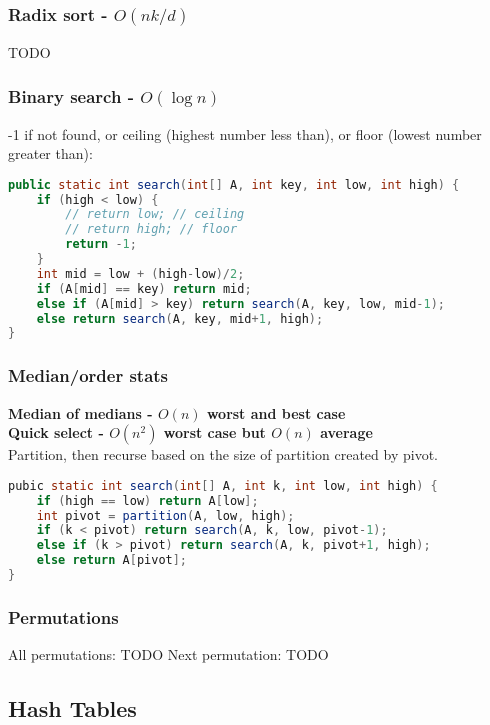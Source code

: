 \documentclass{article}
\begin{document}
\subsubsection{Radix sort - $O(nk/d)$}
TODO
\subsubsection{Binary search - $O(\log n)$}
-1 if not found, or ceiling (highest number less than), or floor (lowest number greater than):
\begin{lstlisting}[language=java]
public static int search(int[] A, int key, int low, int high) {
    if (high < low) {
        // return low; // ceiling
        // return high; // floor
        return -1;
    }
    int mid = low + (high-low)/2;
    if (A[mid] == key) return mid;
    else if (A[mid] > key) return search(A, key, low, mid-1);
    else return search(A, key, mid+1, high);
}
\end{lstlisting}

\subsubsection{Median/order stats}
\textbf{Median of medians - $O(n)$ worst and best case}\\
\textbf{Quick select - $O(n^2)$ worst case but $O(n)$ average}\\
Partition, then recurse based on the size of partition created by pivot.
\begin{lstlisting}[language=java]
pubic static int search(int[] A, int k, int low, int high) {
    if (high == low) return A[low];
    int pivot = partition(A, low, high);
    if (k < pivot) return search(A, k, low, pivot-1);
    else if (k > pivot) return search(A, k, pivot+1, high);
    else return A[pivot];
}
\end{lstlisting}

\subsubsection{Permutations}
All permutations: TODO
Next permutation: TODO

\subsection{Hash Tables}
\end{document}
